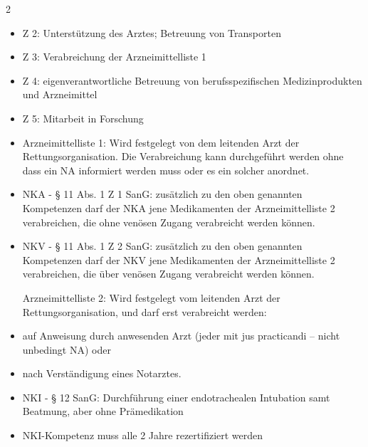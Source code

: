 \documentclass{article}
\begin{document}
\begin{multicols}{2}
\begin{itemize}
\item Z 2: Unterst\"utzung des Arztes; Betreuung von Transporten

\item Z 3: Verabreichung der Arzneimittelliste 1

\item Z 4: eigenverantwortliche Betreuung von berufsspezifischen
Medizinprodukten und Arzneimittel

\item Z 5: Mitarbeit in Forschung

\end{itemize}
\begin{itemize}
\item[] Arzneimittelliste 1: Wird festgelegt von dem leitenden Arzt der
Rettungsorganisation. Die Verabreichung kann durchgef\"uhrt werden ohne
dass ein NA informiert werden muss oder es ein solcher anordnet.

\item NKA - {\S} 11 Abs. 1 Z 1 SanG: zus\"atzlich zu den oben genannten
Kompetenzen darf der NKA jene Medikamenten der Arzneimittelliste 2
verabreichen, die ohne ven\"osen Zugang verabreicht werden k\"onnen.

\item NKV - {\S} 11 Abs. 1 Z 2 SanG: zus\"atzlich zu den oben genannten
Kompetenzen darf der NKV jene Medikamenten der Arzneimittelliste 2
verabreichen, die \"uber ven\"osen Zugang verabreicht werden k\"onnen.

Arzneimittelliste 2: Wird festgelegt vom leitenden Arzt der
Rettungsorganisation, und darf erst verabreicht werden:

\end{itemize}
\begin{itemize}
\item auf Anweisung durch anwesenden Arzt (jeder mit jus practicandi --
nicht unbedingt NA) oder

\item nach Verst\"andigung eines Notarztes.

\end{itemize}
\begin{itemize}
\item NKI - {\S} 12 SanG: Durchf\"uhrung einer endotrachealen Intubation
samt Beatmung, aber ohne Pr\"amedikation

\end{itemize}
\begin{itemize}
\item NKI-Kompetenz muss alle 2 Jahre rezertifiziert werden


\end{itemize}
\end{multicols}
\end{document}

